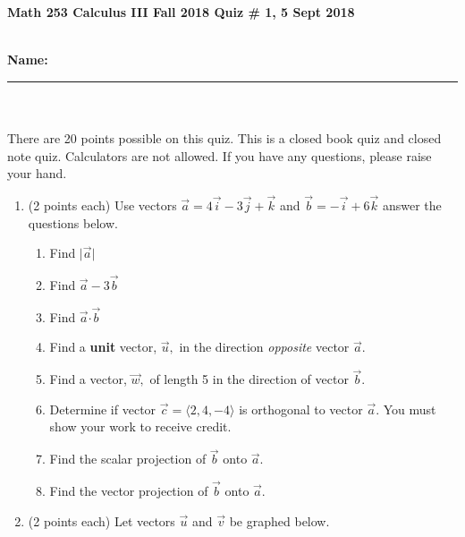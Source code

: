 \documentclass[11pt]{article}
\theoremstyle{remark}
\newcommand{\bcd}{\boldsymbol{\cdot}}
\begin{document}
{\bf Math 253 Calculus III Fall 2018 \hfill Quiz \# 1,  5 Sept 2018 }\\
\\
{\bf Name: \rule{3.5in}{1pt}}\\
\\
\noindent There are 20 points possible on this quiz. This is a closed
book quiz and closed note quiz. Calculators are not allowed. If you have any questions, please
raise your hand.

\begin{enumerate}
\item (2 points each) Use vectors $\vec{a}= 4 \vec{i} - 3 \vec{j} + \vec{k}$ and $\vec{b}= - \vec{i} +6 \vec{k}$ answer the questions below.
\begin{enumerate}
\item Find $\vert \vec{a} \vert$ \\
\vfill

\item Find $\vec{a} -3\vec{b}$ \\
\vfill

\item Find $\vec{a} \bcd \vec{b}$\\
\vfill

\item Find a \textbf{unit} vector, $\vec{u},$ in the direction \emph{opposite} vector $\vec{a}.$\\
\vfill

\item Find a vector, $\vec{w},$ of length 5 in the direction of vector $\vec{b}.$\\
\vfill

\item Determine if vector $\vec{c}= \langle 2,4,-4\rangle$ is orthogonal to vector $\vec{a}.$ You must show your work to receive credit.\\
\vfill

\item Find the scalar projection of $\vec{b}$ onto $\vec{a}.$\\
\vfill

\item Find the vector projection of $\vec{b}$ onto $\vec{a}.$\\
\vfill

\end{enumerate}
\newpage
\item (2 points each) Let vectors $\vec{u}$ and $\vec{v}$ be graphed below.\\
\begin{center}
\end{center}
\vspace{2in}


\end{enumerate}
\end{document}
